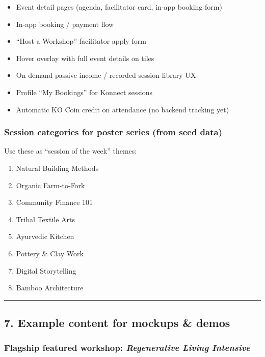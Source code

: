 \documentclass[11pt,a4paper]{report}
\begin{document}
\begin{itemize}
  \item Event detail pages (agenda, facilitator card, in-app booking form)
  \item In-app booking / payment flow
  \item “Host a Workshop” facilitator apply form
  \item Hover overlay with full event details on tiles
  \item On-demand passive income / recorded session library UX
  \item Profile “My Bookings” for Konnect sessions
  \item Automatic KO Coin credit on attendance (no backend tracking yet)
\end{itemize}

\subsubsection{Session categories for poster series (from seed data)}

Use these as “session of the week” themes:


\begin{enumerate}
  \item Natural Building Methods
  \item Organic Farm-to-Fork
  \item Community Finance 101
  \item Tribal Textile Arts
  \item Ayurvedic Kitchen
  \item Pottery \& Clay Work
  \item Digital Storytelling
  \item Bamboo Architecture
\end{enumerate}

\medskip\hrule\medskip

\subsection{7. Example content for mockups \& demos}

\subsubsection{Flagship featured workshop: \textit{Regenerative Living Intensive}}
\end{document}
